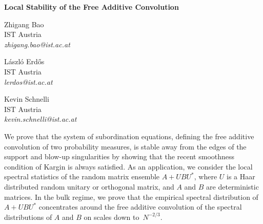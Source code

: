 \documentclass[10pt,reqno]{amsart}
\numberwithin{equation}{section}
\theoremstyle{plain}
\newcounter{kevin}
\numberwithin{kevin}{section}
\theoremstyle{remark}
\begin{document}
 \begin{minipage}{0.85\textwidth}
 \vspace{2.5cm}
 \end{minipage}
\begin{center}
\large\bf
Local Stability of the Free Additive Convolution
\end{center}

\renewcommand{\thefootnote}{\fnsymbol{footnote}}	
\vspace{1cm}
\begin{center}
 \begin{minipage}{0.3\textwidth}
\begin{center}
Zhigang Bao\footnotemark[2]  \\
\footnotesize {IST Austria}\\
{\it zhigang.bao@ist.ac.at}
\end{center}
\end{minipage}
\begin{minipage}{0.3\textwidth}
\begin{center}
L\'aszl\'o Erd{\H o}s\footnotemark[1]  \\
\footnotesize {IST Austria}\\
{\it lerdos@ist.ac.at}
\end{center}
\end{minipage}
\begin{minipage}{0.3\textwidth}
 \begin{center}
Kevin Schnelli\footnotemark[2]\\
\footnotesize 
{IST Austria}\\
{\it kevin.schnelli@ist.ac.at}
\end{center}
\end{minipage}

\renewcommand{\thefootnote}{\fnsymbol{footnote}}	

\end{center}
\vspace{1cm}


\begin{center}
 \begin{minipage}{0.8\textwidth}\footnotesize{}
 We prove that the system of subordination equations, defining the free additive convolution of two probability measures,
is stable away from the edges of the support and blow-up singularities
by showing that the recent smoothness condition of Kargin is always satisfied.
As an application, we consider the local  spectral statistics 
 of the random matrix ensemble  $A+UBU^*$, where  $U$ is a Haar distributed random unitary 
 or orthogonal matrix, and $A$ and $B$ are deterministic matrices. In the bulk regime, we prove that the empirical spectral distribution of~$A+UBU^*$ concentrates around the free additive convolution of the spectral distributions of $A$ and $B$ on scales down to~$N^{-2/3}$.

\end{minipage}
\end{center}
 
\end{document}
